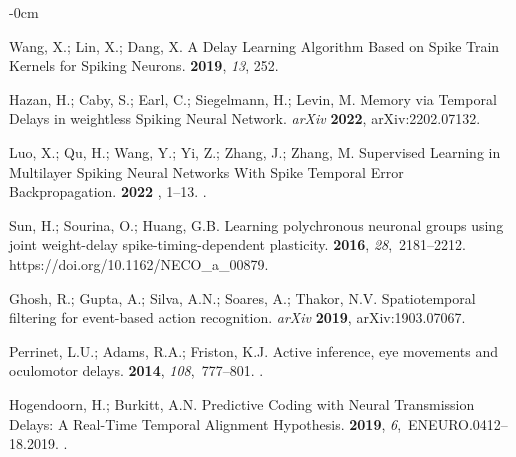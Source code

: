 \documentclass[brainsci, %
               review,accept,pdftex,moreauthors
               ]{Definitions/mdpi}
\begin{document}
\begin{adjustwidth}{-\extralength}{0cm}
\begin{thebibliography}{999}
Wang, X.; Lin, X.; Dang, X.
\newblock A {Delay} {Learning} {Algorithm} {Based} on {Spike} {Train} {Kernels}
  for {Spiking} {Neurons}.
 {\bf 2019}, {\em 13}, 252.

Hazan, H.; Caby, S.; Earl, C.; Siegelmann, H.; Levin, M.
\newblock Memory via {Temporal} {Delays} in weightless {Spiking} {Neural}
  {Network}.  \emph{arXiv} \textbf{2022}, arXiv:2202.07132.

Luo, X.; Qu, H.; Wang, Y.; Yi, Z.; Zhang, J.; Zhang, M.
\newblock Supervised {Learning} in {Multilayer} {Spiking} {Neural} {Networks}
  {With} {Spike} {Temporal} {Error} {Backpropagation}.
 {\bf
  {2022} %
}, 1--13.
.

Sun, H.; Sourina, O.; Huang, G.B.
\newblock Learning polychronous neuronal groups using joint weight-delay
  spike-timing-dependent plasticity.
 {\bf 2016}, {\em 28},~2181--2212.
  {{https://doi.org/10.1162/NECO\_a\_00879}}.

Ghosh, R.; Gupta, A.; Silva, A.N.; Soares, A.; Thakor, N.V.
\newblock Spatiotemporal filtering for event-based action recognition. \emph{arXiv}  \textbf{2019},  	arXiv:1903.07067.

Perrinet, L.U.; Adams, R.A.; Friston, K.J.
\newblock Active inference, eye movements and oculomotor delays.
 {\bf 2014}, {\em 108},~777--801.
.

Hogendoorn, H.; Burkitt, A.N.
\newblock Predictive {Coding} with {Neural} {Transmission} {Delays}: {A}
  {Real}-{Time} {Temporal} {Alignment} {Hypothesis}.
 {\bf 2019}, {\em 6},~ENEURO.0412--18.2019.
.


\end{thebibliography}
\end{adjustwidth}
\end{document}
